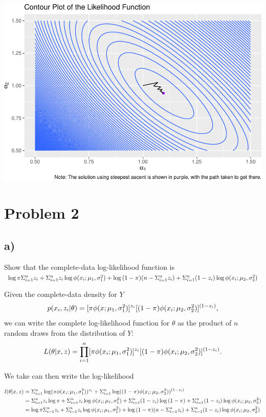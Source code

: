\documentclass[]{article}
\begin{document}
\includegraphics{Atlas-PS_3_files/figure-latex/unnamed-chunk-6-1.pdf}

\section{Problem 2}\label{problem-2}

\subsection{a)}\label{a-1}

Show that the complete-data log-likelihood function is
\(\log{\pi} \Sigma_{i=1}^{n} z_i + \Sigma_{i=1}^{n} z_i \log{\phi(x_i; \mu_{1}, \sigma_{1}^2)} + \log{(1-\pi)}(n - \Sigma_{i=1}^{n} z_i) + \Sigma_{i=1}^{n} (1 - z_i)\log{\phi(x_i; \mu_{2}, \sigma_{2}^2)}\)

Given the complete-data density for \(Y\) \[
p(x_i, z_i|\theta) = [\pi \phi(x; \mu_1, \sigma_1^2)]^{z_i}[(1 - \pi)\phi(x_i; \mu_{2}, \sigma_{2}^2)]^{(1 - z_i)},
\] we can write the complete log-likelihood function for \(\theta\) as
the product of \(n\) random draws from the distribution of \(Y\): \[
L(\theta| x, z)=\prod_{i=1}^{n}[\pi\phi(x_i; \mu_{1}, \sigma_{1}^2)]^{z_i}[(1 - \pi) \phi(x_i; \mu_{2}, \sigma_{2}^2)]^{(1 - z_i)}.
\]

We take can then write the log-likelihood

\begin{align*}
l(\theta | x, z) &= \Sigma_{i=1}^{n} \log(\pi \phi(x_i; \mu_{1}, \sigma_{1}^2))^{z_i} + \Sigma_{i=1}^{n} \log((1-\pi) \phi(x_i; \mu_{2}, \sigma_{2}^2))^{(1-z_i)} \\
&= \Sigma_{i=1}^{n} z_i \log{\pi} + \Sigma_{i=1}^{n} z_i \log{\phi(x_i; \mu_{1}, \sigma_{1}^2)} + \Sigma_{i=1}^{n}(1-z_i)\log{(1-\pi)} + \Sigma_{i=1}^{n}(1- z_i) \log{\phi(x_i; \mu_{2}, \sigma_{2}^2)} \\
&= \log{\pi} \Sigma_{i=1}^{n} z_i + \Sigma_{i=1}^{n} z_i \log{\phi(x_i; \mu_{1}, \sigma_{1}^2)} + \log{(1-\pi)}(n - \Sigma_{i=1}^{n} z_i) + \Sigma_{i=1}^{n} (1 - z_i)\log{\phi(x_i; \mu_{2}, \sigma_{2}^2)}
\end{align*}
\end{document}
